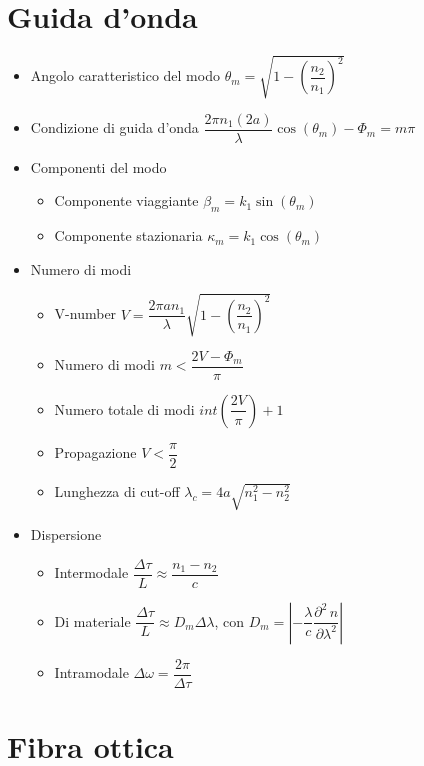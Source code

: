 \documentclass{article}
\begin{document}
\section{Guida d'onda}
\begin{itemize}
  \item Angolo caratteristico del modo \( \theta_m = \sqrt{1 - \left(\dfrac{n_2}{n_1} \right) ^ 2} \)
  \item Condizione di guida d'onda \( \dfrac{2 \pi n_1 (2 a)}{\lambda} \cos(\theta_m) - \Phi_m = m \pi \)
  \item Componenti del modo
        \begin{itemize}
          \item Componente viaggiante \( \beta_m = k_1 \sin(\theta_m)\)
          \item Componente stazionaria \( \kappa_m = k_1 \cos(\theta_m) \)
        \end{itemize}
  \item Numero di modi
        \begin{itemize}
          \item V-number \(\displaystyle V = \dfrac{2 \pi a n_1}{\lambda} \sqrt{1 - \left(\dfrac{n_2}{n_1}\right) ^ 2} \)
          \item Numero di modi \( m < \dfrac{2V - \Phi_m}{\pi} \)
          \item Numero totale di modi \( int\left(\dfrac{2V}{\pi} \right) + 1 \)
          \item Propagazione   \( V < \dfrac{\pi}{2} \)
          \item Lunghezza di cut-off \( \displaystyle \lambda_c = 4a \sqrt{n_1^2 - n_2^2} \)
        \end{itemize}
  \item Dispersione
        \begin{itemize}
          \item Intermodale \( \dfrac{\Delta \tau}{L} \approx \dfrac{n_1 - n_2}{c} \)
          \item Di materiale \( \dfrac{\Delta \tau}{L} \approx D_m \Delta \lambda \), con \( D_m = \left| -\dfrac{\lambda}{c} \dfrac{\partial ^ 2 \, n}{\partial \lambda ^ 2} \right| \)
          \item Intramodale \( \Delta \omega = \dfrac{2 \pi}{\Delta \tau} \)
        \end{itemize}
\end{itemize}

\newpage

\section{Fibra ottica}
\end{document}
